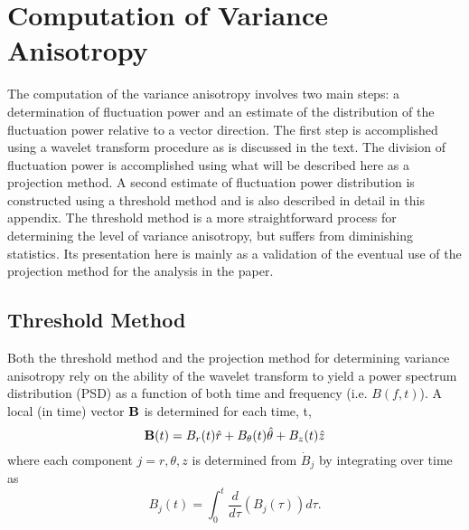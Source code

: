 \documentclass[manuscript]{aastex}
\begin{document}
\appendix

\section{Computation of Variance Anisotropy}\label{sec:projection}

The computation of the variance anisotropy involves two main steps: a determination of fluctuation power and an estimate of the distribution of the fluctuation power relative to a vector direction. The first step is accomplished using a wavelet transform procedure as is discussed in the text. The division of fluctuation power is accomplished using what will be described here as a projection method. A second estimate of fluctuation power distribution is constructed using a threshold method and is also described in detail in this appendix. The threshold method is a more straightforward process for determining the level of variance anisotropy, but suffers from diminishing statistics. Its presentation here is mainly as a validation of the eventual use of the projection method for the analysis in the paper. 

\subsection{Threshold Method}\label{sec:threshold}

Both the threshold method and the projection method for determining variance anisotropy rely on the ability of the wavelet transform to yield a power spectrum distribution (PSD) as a function of both time and frequency (i.e. $B(f,t)$). A local (in time) vector ${\bf B}$ is determined for each time, t,
\begin{equation}
{\bf B}(t) = B_{r}(t)\hat{r} + B_{\theta}(t)\hat{\theta} + B_{z}(t)\hat{z}
\label{eq:Bvector}
\end{equation}
where each component $j=r,\theta,z$ is determined from $\dot{B}_{j}$ by integrating over time as
\begin{equation}
B_{j}(t) = \int_{0}^{t} \frac{d}{d\tau}\left(B_{j}(\tau)\right) d\tau.
\label{eq:Bintegrated}
\end{equation}
\end{document}

